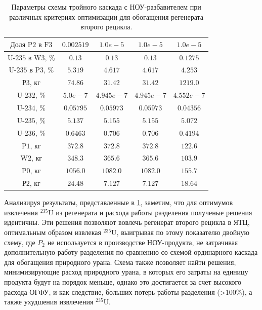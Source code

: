 \begin{table}
\begin{tabular}{ccccc}
        $\text{Доля P2 в F3}$ & $0.002519$ & $1.0e-5$ & $1.0e-5$ & $1.0e-5$\\ \hline
        $\text{U-235 в W3, \%}$ & $0.13$ & $0.13$ & $0.13$ & $0.1275$\\ \hline
        $\text{U-235 в P3, \%}$ & $5.319$ & $4.617$ & $4.617$ & $4.253$\\ \hline
        $\text{Р3, кг}$ & $74.86$ & $31.42$ & $31.42$ & $1219.0$\\ \hline
        $\text{U-232, \%}$ & $5.0e-7$ & $4.945e-7$ & $4.945e-7$ & $4.552e-7$\\ \hline
        $\text{U-234, \%}$ & $0.05795$ & $0.05973$ & $0.05973$ & $0.04356$\\ \hline
        $\text{U-235, \%}$ & $5.137$ & $5.155$ & $5.155$ & $5.072$\\ \hline
        $\text{U-236, \%}$ & $0.6463$ & $0.706$ & $0.706$ & $0.4194$\\ \hline
        $\text{P1, кг}$ & $372.8$ & $372.8$ & $372.8$ & $122.6$\\ \hline
        $\text{W2, кг}$ & $348.3$ & $365.6$ & $365.6$ & $103.9$\\ \hline
        $\text{P0, кг}$ & $1056.0$ & $1082.0$ & $1082.0$ & $155.7$\\ \hline
        $\text{Р2, кг}$ & $24.48$ & $7.127$ & $7.127$ & $18.64$\\ \hline
        \end{tabular}        
\caption{Параметры схемы тройного каскада с НОУ-разбавителем при различных критериях оптимизации для обогащения регенерата второго рецикла.{\label{3opt2}}}
\end{table}

Анализируя результаты, представленные в \ref{3opt2}, заметим, что для оптимумов извлечения  $^{235}$U из регенерата и расхода работы разделения полученые решения идентичны. Эти решения позволяют вовлечь регенерат второго рецикла в ЯТЦ, оптимальным образом извлекая  $^{235}$U, выигрывая по этому показателю двойную схему, где $P_2$ не используется в производстве НОУ-продукта, не затрачивая дополнительную работу разделения по сравнению со схемой ординарного каскада для обогащения природного урана.
Схема также позволяет найти решения, минимизирующие расход природного урана, в которых его затраты на единицу продукта будут на порядок меньше, однако это достигается за счет высокого расхода ОГФУ, и как следствие, больших потерь работы разделения (>100\%), а также ухудшения извлечения  $^{235}$U. 

